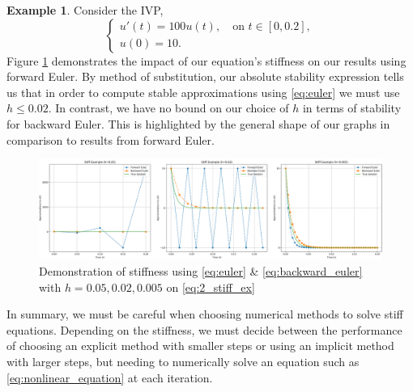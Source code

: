 \documentclass[12pt, twoside]{report}
\theoremstyle{plain}
\theoremstyle{definition}
\theoremstyle{definition}
\newtheorem{example}{Example}[chapter]
\begin{document}
            \begin{example}
                Consider the IVP,
                \begin{equation}
                \label{eq:2_stiff_ex}
                    \begin{cases}
                        u'(t) = 100u(t), \quad \text{on } t \in [0,0.2],\\
                        u(0) = 10.
                    \end{cases}
                \end{equation}
                Figure \ref{2_stiff_graphs} demonstrates the impact of our 
                equation's stiffness on our results using forward Euler. By 
                method of substitution, our absolute stability expression 
                tells us that in order to compute stable approximations using 
                \eqref{eq:euler} we must use $h \le 0.02$. In contrast, we 
                have no bound on our choice of $h$ in terms of stability for 
                backward Euler. This is highlighted by the general shape of 
                our graphs in comparison to results from forward Euler.

                \begin{figure}
                    \centering
                        \includegraphics[width=\columnwidth]{stiff_graphs}
                        \caption{Demonstration of stiffness using 
                        \eqref{eq:euler} \& \eqref{eq:backward_euler}
                        with $h=0.05, 0.02, 0.005$ on \eqref{eq:2_stiff_ex}}
                        \label{2_stiff_graphs}
                \end{figure}
            \end{example}

            In summary, we must be careful when choosing numerical methods to 
            solve stiff equations. Depending on the stiffness, we must decide 
            between the performance of choosing an explicit method with 
            smaller steps or using an implicit method with larger steps, but 
            needing to numerically solve an equation such as 
            \eqref{eq:nonlinear_equation} at each iteration.
\end{document}
